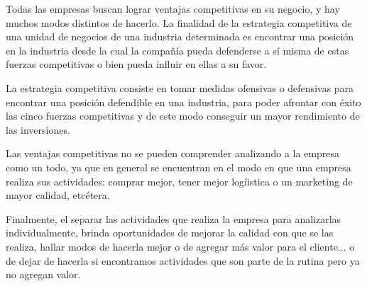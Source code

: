Todas las empresas buscan lograr ventajas competitivas en su negocio, y hay muchos modos
distintos de hacerlo. La finalidad de la estrategia competitiva de una unidad de negocios de una
industria determinada es encontrar una posición en la industria desde la cual la compañía pueda
defenderse a sí misma de estas fuerzas competitivas o bien pueda influir en ellas a su favor.

La estrategia competitiva consiste en tomar medidas ofensivas o defensivas para encontrar una
posición defendible en una industria, para poder afrontar con éxito las cinco fuerzas competitivas
y de este modo conseguir un mayor rendimiento de las inversiones.

Las ventajas competitivas no se pueden comprender analizando a la empresa como un todo,
ya que en general se encuentran en el modo en que una empresa realiza sus actividades: comprar
mejor, tener mejor logíistica o un marketing de mayor calidad, etcétera.

Finalmente, el separar las actividades que realiza la empresa para analizarlas individualmente,
brinda oportunidades de mejorar la calidad con que se las realiza, hallar modos de hacerla mejor
o de agregar más valor para el cliente... o de dejar de hacerla si encontramos actividades que son
parte de la rutina pero ya no agregan valor.
\newpage
